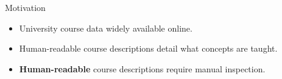 \begin{frame}{Motivation}

  \begin{itemize}
    \item University course data widely available online.
    \item Human-readable course descriptions detail what concepts are taught.
    \item \textbf{Human-readable} course descriptions require manual inspection.
  \end{itemize}


%
%

\end{frame}
